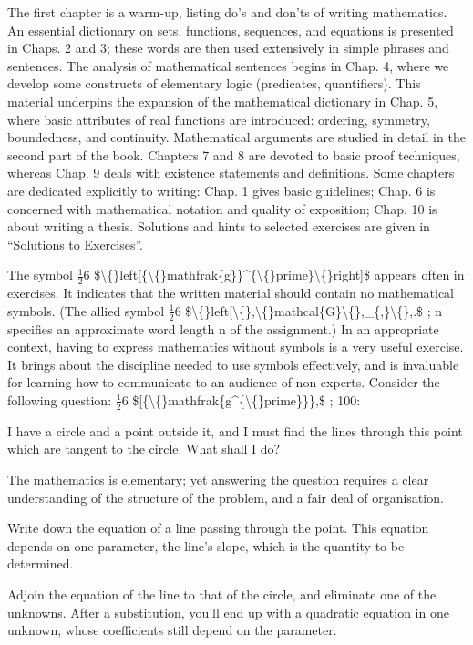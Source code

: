 \documentclass[11pt]{article}
\theoremstyle{plain}
\theoremstyle{definition}
\begin{document}
The first chapter is a warm-up, listing do's and don'ts of writing mathematics. An essential dictionary on sets, functions, sequences, and equations is presented in Chaps. 2 and 3; these words are then used extensively in simple phrases and sentences. The analysis of mathematical sentences begins in Chap. 4, where we develop some constructs of elementary logic (predicates, quantifiers). This material underpins the expansion of the mathematical dictionary in Chap. 5, where basic attributes of real functions are introduced: ordering, symmetry, boundedness, and continuity. Mathematical arguments are studied in detail in the second part of the book. Chapters 7 and 8 are devoted to basic proof techniques, whereas Chap. 9 deals with existence statements and definitions. Some chapters are dedicated explicitly to writing: Chap. 1 gives basic guidelines; Chap. 6 is concerned with mathematical notation and quality of exposition; Chap. 10 is about writing a thesis. Solutions and hints to selected exercises are given in ``Solutions to Exercises''.

The symbol $\frac{1}{2}$6 \$\textbackslash\{\}left[\{\textbackslash\{\}mathfrak\{g\}\}\textasciicircum{}\{\textbackslash\{\}prime\}\textbackslash\{\}right]\$ appears often in exercises. It indicates that the written material should contain no mathematical symbols. (The allied symbol $\frac{1}{2}$6 \$\textbackslash\{\}left[\textbackslash\{\},\textbackslash\{\}mathcal\{G\}\textbackslash\{\},\_\{,\}\textbackslash\{\},.\$ ; n specifies an approximate word length n of the assignment.) In an appropriate context, having to express mathematics without symbols is a very useful exercise. It brings about the discipline needed to use symbols effectively, and is invaluable for learning how to communicate to an audience of non-experts. Consider the following question: $\frac{1}{2}$6 \$[\{\textbackslash\{\}mathfrak\{g\textasciicircum{}\{\textbackslash\{\}prime\}\}\},\$ ; 100:

I have a circle and a point outside it, and I must find the lines through this point which are tangent to the circle. What shall I do?

The mathematics is elementary; yet answering the question requires a clear understanding of the structure of the problem, and a fair deal of organisation.

Write down the equation of a line passing through the point. This equation depends on one parameter, the line's slope, which is the quantity to be determined.

Adjoin the equation of the line to that of the circle, and eliminate one of the unknowns. After a substitution, you'll end up with a quadratic equation in one unknown, whose coefficients still depend on the parameter.
\end{document}
